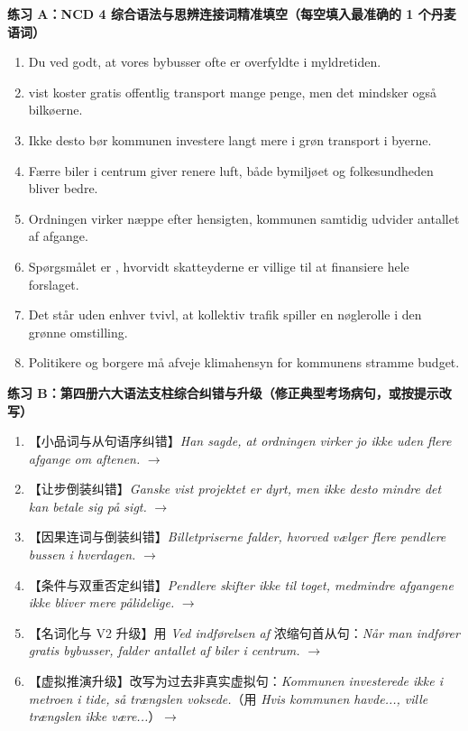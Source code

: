 \textbf{练习 A：NCD 4 综合语法与思辨连接词精准填空（每空填入最准确的 1 个丹麦语词）}
\begin{enumerate}
  \item Du ved \underline{\hspace{2.2cm}} godt, at vores bybusser ofte er overfyldte i myldretiden.
  \item \underline{\hspace{2.2cm}} vist koster gratis offentlig transport mange penge, men det mindsker også bilkøerne.
  \item Ikke desto \underline{\hspace{2.2cm}} bør kommunen investere langt mere i grøn transport i byerne.
  \item Færre biler i centrum giver renere luft, \underline{\hspace{2.2cm}} både bymiljøet og folkesundheden bliver bedre.
  \item Ordningen virker næppe efter hensigten, \underline{\hspace{2.2cm}} kommunen samtidig udvider antallet af afgange.
  \item Spørgsmålet er \underline{\hspace{2.2cm}}, hvorvidt skatteyderne er villige til at finansiere hele forslaget.
  \item Det står uden \underline{\hspace{2.2cm}} enhver tvivl, at kollektiv trafik spiller en nøglerolle i den grønne omstilling.
  \item Politikere og borgere må afveje klimahensyn \underline{\hspace{2.2cm}} for kommunens stramme budget.
\end{enumerate}

\textbf{练习 B：第四册六大语法支柱综合纠错与升级（修正典型考场病句，或按提示改写）}
\begin{enumerate}
  \item 【小品词与从句语序纠错】\textit{Han sagde, at ordningen virker jo ikke uden flere afgange om aftenen.} $\rightarrow$
  \item 【让步倒装纠错】\textit{Ganske vist projektet er dyrt, men ikke desto mindre det kan betale sig på sigt.} $\rightarrow$
  \item 【因果连词与倒装纠错】\textit{Billetpriserne falder, hvorved vælger flere pendlere bussen i hverdagen.} $\rightarrow$
  \item 【条件与双重否定纠错】\textit{Pendlere skifter ikke til toget, medmindre afgangene ikke bliver mere pålidelige.} $\rightarrow$
  \item 【名词化与 V2 升级】用 \textit{Ved indførelsen af} 浓缩句首从句：\textit{Når man indfører gratis bybusser, falder antallet af biler i centrum.} $\rightarrow$
  \item 【虚拟推演升级】改写为过去非真实虚拟句：\textit{Kommunen investerede ikke i metroen i tide, så trængslen voksede.}（用 \textit{Hvis kommunen havde..., ville trængslen ikke være...}）$\rightarrow$
\end{enumerate}

